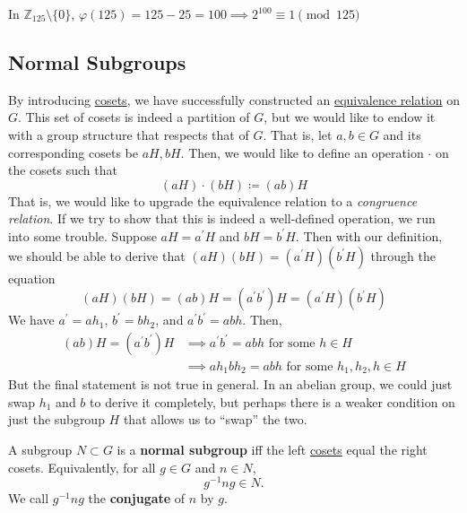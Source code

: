   \begin{example}
    \label{ex:eulers-theorem-modulo-125}
    In $\mathbb{Z}_{125} \setminus \{0\}$, $\varphi(125) = 125 - 25 = 100 \implies 2^{100} \equiv 1 \pmod{125}$
  \end{example}

\subsection{Normal Subgroups}

  By introducing \hyperref[def:coset]{cosets}, we have successfully constructed an \hyperref[st-def:equivalence_relation]{equivalence relation} on $G$. This set of cosets is indeed a partition of $G$, but we would like to endow it with a group structure that respects that of $G$. That is, let $a, b \in G$ and its corresponding cosets be $aH, bH$. Then, we would like to define an operation $\cdot$ on the cosets such that 
  \begin{equation}
    (aH) \cdot (bH) \coloneqq (ab)H
  \end{equation} 
  That is, we would like to upgrade the equivalence relation to a \textit{congruence relation}. If we try to show that this is indeed a well-defined operation, we run into some trouble. Suppose $aH = a^\prime H$ and $bH = b^\prime H$. Then with our definition, we should be able to derive that $(aH)(bH) = (a^\prime H) (b^\prime H)$ through the equation 
  \begin{equation}
     (aH) (bH) = (ab)H = (a^\prime b^\prime) H = (a^\prime H) (b^\prime H) 
  \end{equation}
  We have $a^\prime = a h_1$, $b^\prime = b h_2$, and $a^\prime b^\prime = ab h$. Then, 
  \begin{align}
    (ab) H = (a^\prime b^\prime) H & \implies a^\prime b^\prime = abh \text{ for some } h \in H \\
                                   & \implies a h_1 b h_2 = abh \text{ for some } h_1, h_2, h \in H
  \end{align}
  But the final statement is not true in general. In an abelian group, we could just swap $h_1$ and $b$ to derive it completely, but perhaps there is a weaker condition on just the subgroup $H$ that allows us to ``swap'' the two. 

	\begin{definition}
		\label{def:normal_subgroup}
		A subgroup $N \subset G$ is a \textbf{normal subgroup} iff the left \hyperref[def:coset]{cosets} equal the right cosets. Equivalently, for all $g \in G$ and $n \in N$,
		\begin{equation}
			g^{-1}ng \in N.
		\end{equation}
		We call $g^{-1}ng$ the \textbf{conjugate} of $n$ by $g$.
	\end{definition}

